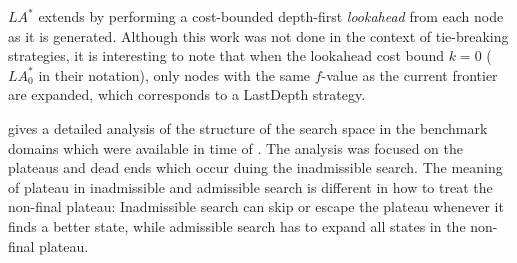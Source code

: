 
$LA^*$ \cite{stern2010look} extends \astar by performing a
cost-bounded depth-first \emph{lookahead} from each node as it is generated.
Although this work was not done in the context of tie-breaking strategies, it is interesting to note that 
when the lookahead cost bound $k=0$ ($LA^*_0$ in their notation), only nodes with the same $f$-value as the current \astar frontier are expanded, which corresponds to a LastDepth strategy.


\citeauthor{Hoffmann05} gives a detailed analysis of the
structure of the search space in the benchmark domains which were
available in time of \citeyear{Hoffmann05}
\cite{Hoffmann05,Hoffmann14}. 
The analysis was focused on the plateaus and dead ends which occur duing the inadmissible search.
The meaning of plateau in inadmissible and admissible search is
different in how to treat the non-final plateau: Inadmissible search can
skip or escape the plateau whenever it finds a better state, while
admissible search has to expand all states in the non-final plateau.

